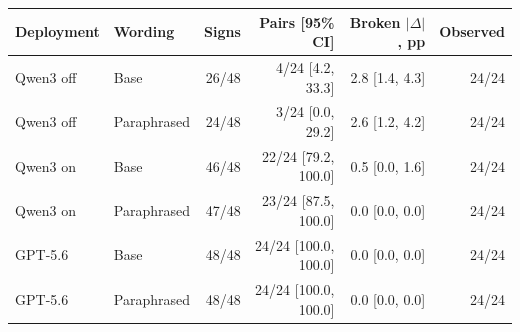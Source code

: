 \begin{tabular}{llrrrr}
\toprule
Deployment & Wording & Signs & Pairs [95\% CI] & Broken $|\Delta|$, pp & Observed \\
\midrule
Qwen3 off & Base & 26/48 & 4/24 [4.2, 33.3] & 2.8 [1.4, 4.3] & 24/24 \\
Qwen3 off & Paraphrased & 24/48 & 3/24 [0.0, 29.2] & 2.6 [1.2, 4.2] & 24/24 \\
Qwen3 on & Base & 46/48 & 22/24 [79.2, 100.0] & 0.5 [0.0, 1.6] & 24/24 \\
Qwen3 on & Paraphrased & 47/48 & 23/24 [87.5, 100.0] & 0.0 [0.0, 0.0] & 24/24 \\
GPT-5.6 & Base & 48/48 & 24/24 [100.0, 100.0] & 0.0 [0.0, 0.0] & 24/24 \\
GPT-5.6 & Paraphrased & 48/48 & 24/24 [100.0, 100.0] & 0.0 [0.0, 0.0] & 24/24 \\
\bottomrule
\end{tabular}
